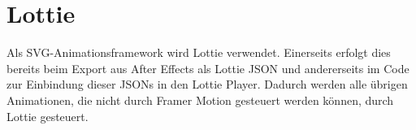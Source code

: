 \section{Lottie}
Als SVG-Animationsframework wird Lottie verwendet. Einerseits erfolgt dies bereits beim Export aus After Effects als Lottie JSON und andererseits im Code zur Einbindung dieser JSONs in den Lottie Player. Dadurch werden alle übrigen Animationen, die nicht durch Framer Motion gesteuert werden können, durch Lottie gesteuert.  